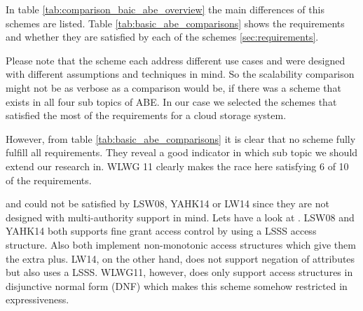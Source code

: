 In table \ref{tab:comparison_baic_abe_overview} the main differences of this schemes are listed.  Table \ref{tab:basic_abe_comparisons} shows the requirements and whether they are satisfied by each of the schemes \ref{sec:requirements}. 

Please note that the scheme each address different use cases and were designed with different assumptions and techniques in mind. So the scalability comparison might not be as verbose as a comparison would be, if there was a scheme that exists in all four sub topics of ABE. In our case we selected the schemes that satisfied the most of the requirements for a cloud storage system. 

However, from table \ref{tab:basic_abe_comparisons} it is clear that no scheme fully fulfill all requirements. They reveal a good indicator in which sub topic we should extend our research in. WLWG 11 clearly makes the race here satisfying 6 of 10 of the requirements. 

 and  could not be satisfied by LSW08, YAHK14 or LW14 since they are not designed with multi-authority support in mind. 
Lets have a look at . LSW08 and YAHK14 both supports fine grant access control by using a \ac{LSSS} access structure. Also both implement non-monotonic access structures which give them the extra plus. LW14, on the other hand, does not support negation of attributes but also uses a LSSS. WLWG11, however, does only support access structures in disjunctive normal form
 (\ac{DNF}) which makes this scheme somehow restricted in expressiveness. 

